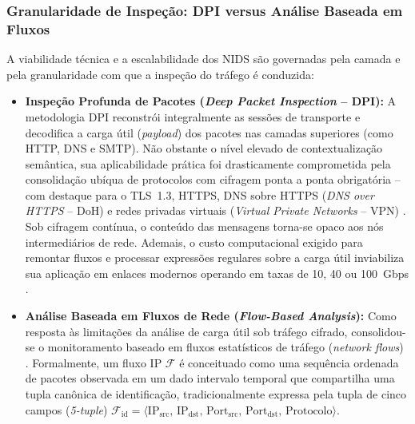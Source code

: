 \subsubsection{Granularidade de Inspeção: DPI versus Análise Baseada em Fluxos}
\label{subsubsec:dpi_vs_fluxos}

A viabilidade técnica e a escalabilidade dos NIDS são governadas pela camada e pela granularidade com que a inspeção do tráfego é conduzida:

\begin{itemize}
    \item \textbf{Inspeção Profunda de Pacotes (\emph{Deep Packet Inspection} -- DPI):}
    A metodologia DPI reconstrói integralmente as sessões de transporte e decodifica a carga útil (\emph{payload}) dos pacotes nas camadas superiores (como HTTP, DNS e SMTP). Não obstante o nível elevado de contextualização semântica, sua aplicabilidade prática foi drasticamente comprometida pela consolidação ubíqua de protocolos com cifragem ponta a ponta obrigatória -- com destaque para o TLS~1.3, HTTPS, DNS sobre HTTPS (\emph{DNS over HTTPS} -- DoH) e redes privadas virtuais (\emph{Virtual Private Networks} -- VPN) \cite{standard2021, trafficmoe2026}. Sob cifragem contínua, o conteúdo das mensagens torna-se opaco aos nós intermediários de rede. Ademais, o custo computacional exigido para remontar fluxos e processar expressões regulares sobre a carga útil inviabiliza sua aplicação em enlaces modernos operando em taxas de 10, 40 ou 100~Gbps \cite{p4nids2025}.

    \item \textbf{Análise Baseada em Fluxos de Rede (\emph{Flow-Based Analysis}):}
    Como resposta às limitações da análise de carga útil sob tráfego cifrado, consolidou-se o monitoramento baseado em fluxos estatísticos de tráfego (\emph{network flows}) \cite{netflow2020, AOUINI2022108719}. Formalmente, um fluxo IP $\mathcal{F}$ é conceituado como uma sequência ordenada de pacotes observada em um dado intervalo temporal que compartilha uma tupla canônica de identificação, tradicionalmente expressa pela tupla de cinco campos (\emph{5-tuple}) $\mathcal{F}_{\mathrm{id}} = \langle \mathrm{IP}_{\mathrm{src}}, \, \mathrm{IP}_{\mathrm{dst}}, \, \mathrm{Port}_{\mathrm{src}}, \, \mathrm{Port}_{\mathrm{dst}}, \, \mathrm{Protocolo} \rangle$.
    

\end{itemize}
